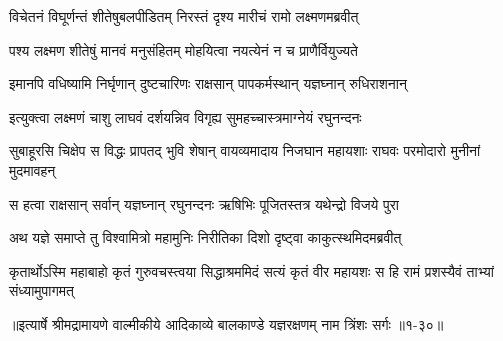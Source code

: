 \twolineshloka
{विचेतनं विघूर्णन्तं शीतेषुबलपीडितम्}
{निरस्तं दृश्य मारीचं रामो लक्ष्मणमब्रवीत्} %

\twolineshloka
{पश्य लक्ष्मण शीतेषुं मानवं मनुसंहितम्}
{मोहयित्वा नयत्येनं न च प्राणैर्वियुज्यते} %

\twolineshloka
{इमानपि वधिष्यामि निर्घृणान् दुष्टचारिणः}
{राक्षसान् पापकर्मस्थान् यज्ञघ्नान् रुधिराशनान्} %

\twolineshloka
{इत्युक्त्वा लक्ष्मणं चाशु लाघवं दर्शयन्निव}
{विगृह्य सुमहच्चास्त्रमाग्नेयं रघुनन्दनः} %

\threelineshloka
{सुबाहूरसि चिक्षेप स विद्धः प्रापतद् भुवि}
{शेषान् वायव्यमादाय निजघान महायशाः}
{राघवः परमोदारो मुनीनां मुदमावहन्} %

\twolineshloka
{स हत्वा राक्षसान् सर्वान् यज्ञघ्नान् रघुनन्दनः}
{ऋषिभिः पूजितस्तत्र यथेन्द्रो विजये पुरा} %

\twolineshloka
{अथ यज्ञे समाप्ते तु विश्वामित्रो महामुनिः}
{निरीतिका दिशो दृष्ट्वा काकुत्स्थमिदमब्रवीत्} %

\threelineshloka
{कृतार्थोऽस्मि महाबाहो कृतं गुरुवचस्त्वया}
{सिद्धाश्रममिदं सत्यं कृतं वीर महायशः}
{स हि रामं प्रशस्यैवं ताभ्यां संध्यामुपागमत्} %


॥इत्यार्षे श्रीमद्रामायणे वाल्मीकीये आदिकाव्ये बालकाण्डे यज्ञरक्षणम् नाम त्रिंशः सर्गः ॥१-३०॥
